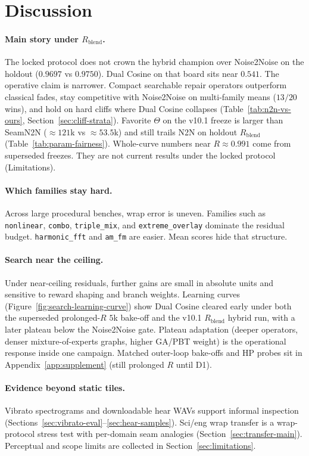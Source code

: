 \section{Discussion}
\label{sec:discussion}

\paragraph{Main story under $R_{\mathrm{blend}}$.}
The locked protocol does not crown the hybrid champion over Noise2Noise on the holdout
($0.9697$ vs $0.9750$).
Dual Cosine on that board sits near $0.541$.
The operative claim is narrower.
Compact searchable repair operators outperform classical fades, stay competitive with Noise2Noise on multi-family means ($13/20$ wins), and hold on hard cliffs where Dual Cosine collapses
(Table~\ref{tab:n2n-vs-ours}, Section~\ref{sec:cliff-strata}).
Favorite $\Theta$ on the v10.1 freeze is larger than SeamN2N (${\approx}121$k vs ${\approx}53.5$k) and still trails N2N on holdout $R_{\mathrm{blend}}$
(Table~\ref{tab:param-fairness}).
Whole-curve numbers near $R{\approx}0.991$ come from superseded freezes.
They are not current results under the locked protocol (Limitations).

\paragraph{Which families stay hard.}
Across large procedural benches, wrap error is uneven.
Families such as \texttt{nonlinear}, \texttt{combo}, \texttt{triple\_mix}, and \texttt{extreme\_overlay} dominate the residual budget.
\texttt{harmonic\_fft} and \texttt{am\_fm} are easier.
Mean scores hide that structure.

\paragraph{Search near the ceiling.}
Under near-ceiling residuals, further gains are small in absolute units and sensitive to reward shaping and branch weights.
Learning curves (Figure~\ref{fig:search-learning-curve}) show Dual Cosine cleared early under both the superseded prolonged-$R$ $5$k bake-off and the v10.1 $R_{\mathrm{blend}}$ hybrid run, with a later plateau below the Noise2Noise gate.
Plateau adaptation (deeper operators, denser mixture-of-experts graphs, higher GA/PBT weight) is the operational response inside one campaign.
Matched outer-loop bake-offs and HP probes sit in Appendix~\ref{app:supplement} (still prolonged $R$ until D1).

\paragraph{Evidence beyond static tiles.}
Vibrato spectrograms and downloadable hear WAVs support informal inspection (Sections~\ref{sec:vibrato-eval}--\ref{sec:hear-samples}).
Sci/eng wrap transfer is a wrap-protocol stress test with per-domain seam analogies (Section~\ref{sec:transfer-main}).
Perceptual and scope limits are collected in Section~\ref{sec:limitations}.
